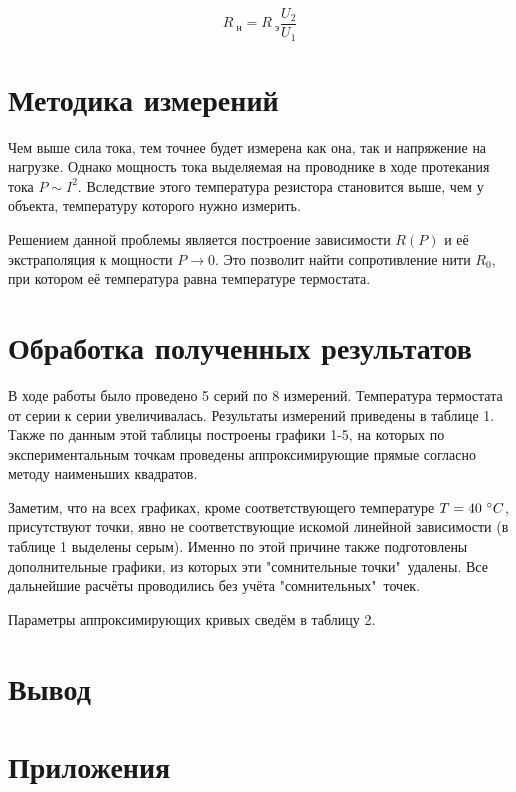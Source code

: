 \documentclass[15pt,a5paper,reqno]{article}
\begin{document}
    \begin{equation}
        R_{\text{ н}} = R_{\text{ э}}\frac{U_2}{U_1}
    \end{equation}
    
\section{Методика измерений}	

    Чем выше сила тока, тем точнее будет измерена как она, так и напряжение на нагрузке. Однако мощность тока выделяемая на проводнике в ходе протекания тока $P\sim I^2$. Вследствие этого температура резистора становится выше, чем у объекта, температуру которого нужно измерить.
    
    Решением данной проблемы является построение зависимости $R(P)$ и её экстраполяция к мощности $P\rightarrow 0$. Это позволит найти сопротивление нити $R_0$, при котором её температура равна температуре термостата.

\section{Обработка полученных результатов}

    В ходе работы было проведено 5 серий по 8 измерений. Температура термостата от серии к серии увеличивалась. Результаты измерений приведены в таблице 1. Также по данным этой таблицы построены графики 1-5, на которых по экспериментальным точкам проведены аппроксимирующие прямые согласно методу наименьших квадратов.
    
    Заметим, что на всех графиках, кроме соответствующего температуре $T = 40\ \degree C$, присутствуют точки, явно не соответствующие искомой линейной зависимости (в таблице 1 выделены серым). Именно по этой причине также подготовлены дополнительные графики, из которых эти "сомнительные точки"\ удалены. Все дальнейшие расчёты проводились без учёта "сомнительных"\ точек.
    
    Параметры аппроксимирующих кривых сведём в таблицу 2.
    

\section{Вывод}


\newpage
\section{Приложения}
\end{document}
